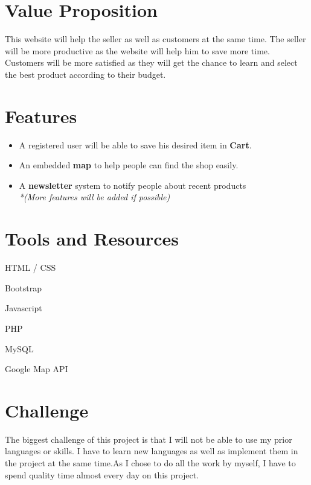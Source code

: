 \documentclass[12pt]{article}
\begin{document}
\section*{Value Proposition}
This website will help the seller as well as customers at the same time. The seller will be more productive as the website will help him to save more time. Customers will be more satisfied as they will get the chance to learn and select the best product according to their budget.

\section*{Features}
\begin{itemize}
\item  A registered user will be able to save his desired item in \textbf{Cart}.
\item  An embedded \textbf{map} to help people can find the shop easily.
\item  A \textbf{newsletter} system to notify people about recent products \\ 
\textit{*(More features will be added if possible)}
\end{itemize}

\section*{Tools and Resources}
\begin{itemize}
\begin{multicols}{2}
\item  HTML / CSS
\item  Bootstrap
\item  Javascript
\item  PHP
\item  MySQL
\item  Google Map API
\end{multicols}
\end{itemize}
\section*{Challenge} 
The biggest challenge of this project is that I will not be able to use my prior languages or skills. I have to learn new languages as well as implement them in the project at the same time.As I chose to do all the work by myself, I have to spend quality time almost every day on this project.
\end{document}
